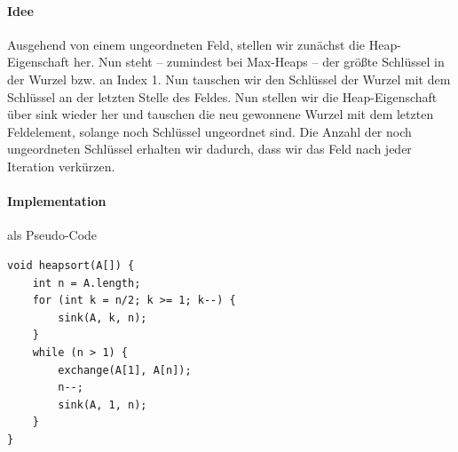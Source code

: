 \documentclass[11pt,a4paper]{scrartcl}
\begin{document}
\paragraph{Idee}
Ausgehend von einem ungeordneten Feld, stellen wir zunächst die Heap-Eigenschaft her. Nun steht -- zumindest bei Max-Heaps -- der größte Schlüssel in der Wurzel bzw. an Index 1. Nun tauschen wir den Schlüssel der Wurzel mit dem Schlüssel an der letzten Stelle des Feldes. Nun stellen wir die Heap-Eigenschaft über sink wieder her und tauschen die neu gewonnene Wurzel mit dem letzten Feldelement, solange noch Schlüssel ungeordnet sind. Die Anzahl der noch ungeordneten Schlüssel erhalten wir dadurch, dass wir das Feld nach jeder Iteration verkürzen.
\paragraph{Implementation} als Pseudo-Code
\begin{lstlisting}
void heapsort(A[]) {
	int n = A.length;
	for (int k = n/2; k >= 1; k--) {
		sink(A, k, n);
	}
	while (n > 1) {
		exchange(A[1], A[n]);
		n--;
		sink(A, 1, n);	
	}
}
\end{lstlisting}
\end{document}
